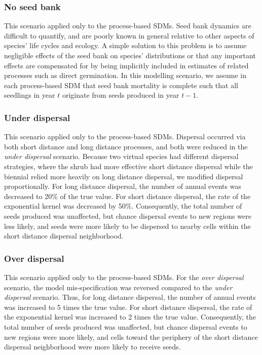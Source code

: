 \documentclass[]{article}
\begin{document}
\subsubsection{No seed bank}

This scenario applied only to the process-based SDMs. Seed bank dynamics
are difficult to quantify, and are poorly known in general relative to
other aspects of species' life cycles and ecology. A simple solution to
this problem is to assume negligible effects of the seed bank on
species' distributions or that any important effects are compensated for
by being implicitly included in estimates of related processes such as
direct germination. In this modelling scenario, we assume in each
process-based SDM that seed bank mortality is complete such that all
seedlings in year \(t\) originate from seeds produced in year \(t-1\).

\subsubsection{Under dispersal}

This scenario applied only to the process-based SDMs. Dispersal occurred
via both short distance and long distance processes, and both were
reduced in the \emph{under dispersal} scenario. Because two virtual
species had different dispersal strategies, where the shrub had more
effective short distance dispersal while the biennial relied more
heavily on long distance dispersal, we modified dispersal
proportionally. For long distance dispersal, the number of annual events
was decreased to 20\% of the true value. For short distance dispersal,
the rate of the exponential kernel was decreased by 50\%. Consequently,
the total number of seeds produced was unaffected, but chance dispersal
events to new regions were less likely, and seeds were more likely to be
dispersed to nearby cells within the short distance dispersal
neighborhood.

\subsubsection{Over dispersal}

This scenario applied only to the process-based SDMs. For the
\emph{over dispersal} scenario, the model mis-specification was reversed
compared to the \emph{under dispersal} scenario. Thus, for long distance
dispersal, the number of annual events was increased to 5 times the true
value. For short distance dispersal, the rate of the exponential kernel
was increased to 2 times the true value. Consequently, the total number
of seeds produced was unaffected, but chance dispersal events to new
regions were more likely, and cells toward the periphery of the short
distance dispersal neighborhood were more likely to receive seeds.
\end{document}
